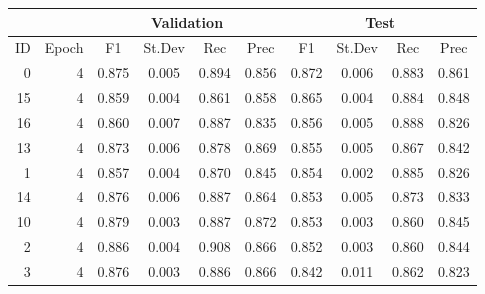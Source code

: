 \begin{tabular}{rr|cccc|cccc}
\hline
        &        &             \multicolumn{4}{c|}{Validation}   & \multicolumn{4}{c}{Test} \\
\hline
     ID &  Epoch &       F1 &      St.Dev &      Rec &      Prec &       F1 &       St.Dev &  Rec      &       Prec \\
\hline
      0 &      4 &    0.875 &       0.005 &    0.894 &     0.856 &    0.872 &        0.006 &     0.883 &      0.861 \\
     15 &      4 &    0.859 &       0.004 &    0.861 &     0.858 &    0.865 &        0.004 &     0.884 &      0.848 \\
     16 &      4 &    0.860 &       0.007 &    0.887 &     0.835 &    0.856 &        0.005 &     0.888 &      0.826 \\
     13 &      4 &    0.873 &       0.006 &    0.878 &     0.869 &    0.855 &        0.005 &     0.867 &      0.842 \\
      1 &      4 &    0.857 &       0.004 &    0.870 &     0.845 &    0.854 &        0.002 &     0.885 &      0.826 \\
     14 &      4 &    0.876 &       0.006 &    0.887 &     0.864 &    0.853 &        0.005 &     0.873 &      0.833 \\
     10 &      4 &    0.879 &       0.003 &    0.887 &     0.872 &    0.853 &        0.003 &     0.860 &      0.845 \\
      2 &      4 &    0.886 &       0.004 &    0.908 &     0.866 &    0.852 &        0.003 &     0.860 &      0.844 \\
      3 &      4 &    0.876 &       0.003 &    0.886 &     0.866 &    0.842 &        0.011 &     0.862 &      0.823 \\
\hline
\end{tabular}
